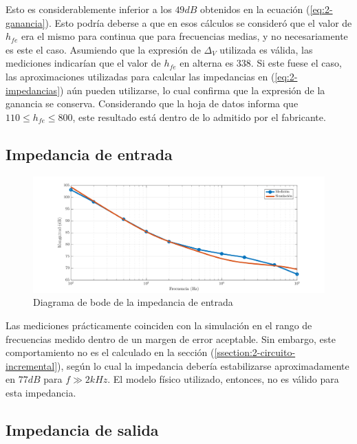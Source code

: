 \documentclass[../../e1_tp1_main.tex]{subfiles}
\begin{document}
Esto es considerablemente inferior a los $49dB$ obtenidos en la ecuaci\'on (\ref{eq:2-ganancia}). Esto podr\'ia deberse a que en esos c\'alculos se consider\'o que el valor de $h_{fe}$ era el mismo para continua que para frecuencias medias, y no necesariamente es este el caso. Asumiendo que la expresi\'on de $\Delta_V$ utilizada es v\'alida, las mediciones indicar\'ian que el valor de $h_{fe}$ en alterna es 338. Si este fuese el caso, las aproximaciones utilizadas para calcular las impedancias en (\ref{eq:2-impedancias}) a\'un pueden utilizarse, lo cual confirma que la expresi\'on de la ganancia se conserva. Considerando que la hoja de datos informa que $110 \leq h_{fe} \leq 800$, este resultado est\'a dentro de lo admitido por el fabricante.




\subsection{Impedancia de entrada}

\begin{figure} [H]
	\centering
	\includegraphics[scale=0.65]{imagenes/e1_tp1_ej2_zin_mag.png}	
	\caption{Diagrama de bode de la impedancia de entrada}
\end{figure}

Las mediciones pr\'acticamente coinciden con la simulaci\'on en el rango de frecuencias medido dentro de un margen de error aceptable. Sin embargo, este comportamiento no es el calculado en la secci\'on (\ref{ssection:2-circuito-incremental}), seg\'un lo cual la impedancia deber\'ia estabilizarse aproximadamente en $77dB$ para $f\gg 2kHz$. El modelo f\'isico utilizado, entonces, no es v\'alido para esta impedancia.



\subsection{Impedancia de salida}
\end{document}
